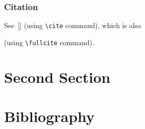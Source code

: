 \documentclass{beamer}
\theoremstyle{plain} %
\theoremstyle{example} %
\begin{document}
\begin{frame}[fragile]
	\frametitle{Citation}
	
	See~[\cite{Rosen2011}] (using \verb+\cite+ command), which is also
	
	
	(using \verb+\fullcite+ command).
	
\end{frame}

\section{Second Section}

\section{Bibliography}
\end{document}
